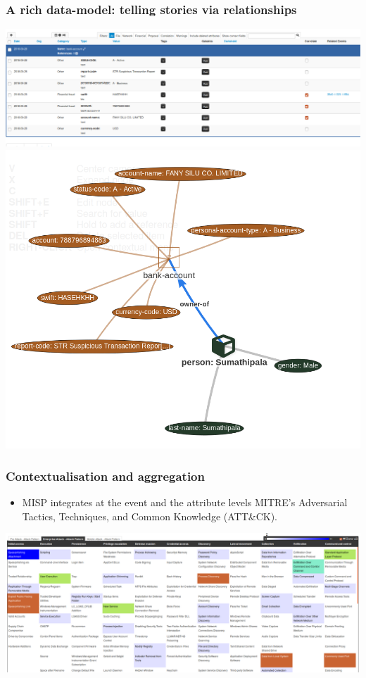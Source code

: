 \begin{frame}
        \frametitle{A rich data-model: telling stories via relationships}
        \includegraphics[scale=0.24]{screenshots/bankaccount.png}
        \includegraphics[scale=0.18]{screenshots/bankview.png}
\end{frame}

\begin{frame}
        \frametitle{Contextualisation and aggregation}
        \begin{itemize}
                \item MISP integrates at the event and the attribute levels MITRE's Adversarial Tactics, Techniques, and Common Knowledge (ATT\&CK).
        \end{itemize}
        \includegraphics[scale=0.2]{screenshots/attack-screenshot.png}
\end{frame}

